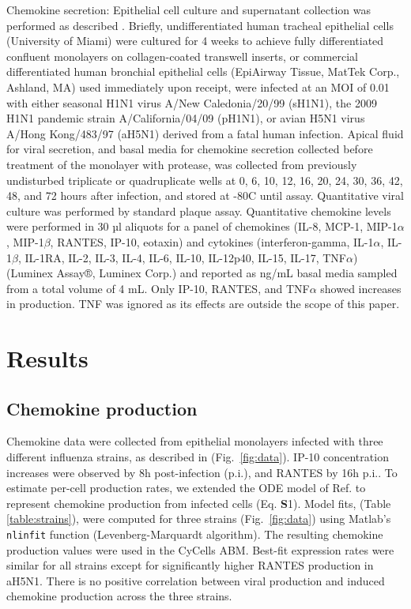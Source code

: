 \documentclass[10pt]{article}
\begin{document}
Chemokine secretion:  Epithelial cell culture and supernatant collection was performed as described \cite{Mitchell2011}.  Briefly, undifferentiated human tracheal epithelial cells (University of Miami) were cultured for 4 weeks to achieve fully differentiated confluent monolayers on collagen-coated transwell inserts, or commercial differentiated human bronchial epithelial cells (EpiAirway Tissue, MatTek Corp., Ashland, MA) used immediately upon receipt, were infected at an MOI of 0.01 with either seasonal H1N1 virus A/New Caledonia/20/99 (sH1N1), the 2009 H1N1 pandemic strain A/California/04/09 (pH1N1), or avian H5N1 virus A/Hong Kong/483/97 (aH5N1) derived from a fatal human infection.  Apical fluid for viral secretion, and basal media for chemokine secretion collected before treatment of the monolayer with protease, was collected from previously undisturbed triplicate or quadruplicate wells at 0, 6, 10, 12, 16, 20, 24, 30, 36, 42, 48, and 72 hours after infection, and stored at -80C until assay.  Quantitative viral culture was performed by standard plaque assay.  Quantitative chemokine levels were performed in 30 µl aliquots for a panel of chemokines (IL-8, MCP-1, MIP-1$\alpha$, MIP-1$\beta$, RANTES, IP-10, eotaxin) and cytokines (interferon-gamma, IL-1$\alpha$, IL-1$\beta$, IL-1RA, IL-2, IL-3, IL-4, IL-6, IL-10, IL-12p40, IL-15, IL-17, TNF$\alpha$) (Luminex Assay®, Luminex Corp.) and reported as ng/mL basal media sampled from a total volume of 4 mL.  Only IP-10, RANTES, and TNF$\alpha$ showed increases in production.  TNF was ignored as its effects are outside the scope of this paper.


\section*{Results}

\subsection*{Chemokine production}

Chemokine data were collected from epithelial monolayers infected with three different influenza strains, as described in \cite{Mitchell2011} (Fig.~\ref{fig:data}).  IP-10 concentration increases were observed by 8h post-infection (p.i.), and RANTES by 16h p.i..  To estimate per-cell production rates, we extended the ODE model of Ref. \cite{Mitchell2011} to represent chemokine production from infected cells (Eq. \textbf{S}1).  Model fits, (Table \ref{table:strains}), were computed for three strains (Fig.~\ref{fig:data}) using Matlab's \texttt{nlinfit} function (Levenberg-Marquardt algorithm).  The resulting chemokine production values were used in the CyCells ABM.  Best-fit expression rates were similar for all strains except for significantly higher RANTES production in aH5N1.  There is no positive correlation between viral production and induced chemokine production across the three strains.
\end{document}

